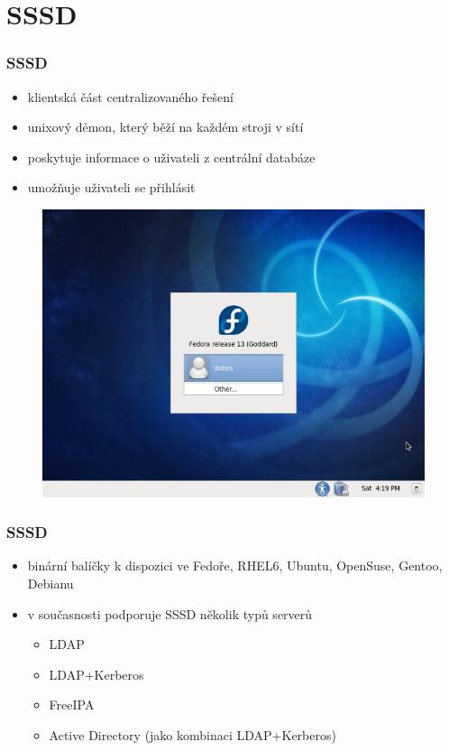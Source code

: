 \documentclass[pdftex,unicode,xcolor=table]{beamer}
\begin{document}
\section{SSSD}
\begin{frame}
    \frametitle{SSSD}
    \begin{itemize}
        \item klientská část centralizovaného řešení
        \item unixový démon, který běží na každém stroji v sítí
        \item poskytuje informace o uživateli z centrální databáze
        \item umožňuje uživateli se přihlásit
    \end{itemize}
    \begin{figure}
        \includegraphics[scale=0.25]{img/gdm.png}
    \end{figure}
\end{frame}

\begin{frame}
    \frametitle{SSSD}
    \begin{itemize}
        \item binární balíčky k dispozici ve Fedoře, RHEL6, Ubuntu, OpenSuse, Gentoo, Debianu
        \item v současnosti podporuje SSSD několik typů serverů
        \begin{itemize}
            \item LDAP
            \item LDAP+Kerberos
            \item FreeIPA
            \item Active Directory (jako kombinaci LDAP+Kerberos)
        \end{itemize}
    \end{itemize}
\end{frame}
\end{document}
